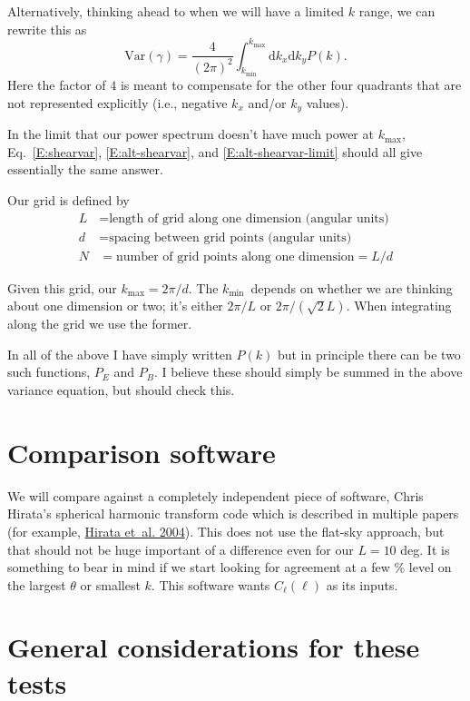 \documentclass[preprint]{aastex}
\newcommand{\kmax}{\ensuremath{k_\mathrm{max}}}
\newcommand{\kmin}{\ensuremath{k_\mathrm{min}}}
\newcommand{\rmd}{\ensuremath{\mathrm{d}}}
\newcommand{\beq}{\begin{equation}}
\newcommand{\eeq}{\end{equation}}
\begin{document}
Alternatively, thinking ahead to when we will have a limited $k$
range, we can rewrite this as
\beq\label{E:alt-shearvar-limit}
\mathrm{Var}(\gamma) = \frac{4}{(2\pi)^2} \int_{\kmin}^{\kmax} \rmd
k_x \rmd k_y P(k).
\eeq
Here the factor of $4$ is meant to compensate for the other four
quadrants that are not represented explicitly (i.e., negative $k_x$
and/or $k_y$ values).

In the limit that our power spectrum doesn't have much power at
\kmax, Eq.~\ref{E:shearvar}, \ref{E:alt-shearvar}, and
\ref{E:alt-shearvar-limit} should all give essentially the same answer.

Our
grid is defined by
\begin{align}
L &= \mbox{length of grid along one dimension (angular units)}\\
d &= \mbox{spacing between grid points (angular units)}\\
N &= \mbox{number of grid points along one dimension} = L/d
\end{align}

Given this grid, our $\kmax=2\pi/d$.  The \kmin\ depends on whether
we are thinking about one dimension or two; it's either $2\pi/L$ or
$2\pi/(\sqrt{2}L)$.  When integrating along the grid we use the former.

In all of the above I have simply written $P(k)$ but in principle there can be
two such functions, $P_{E}$ and $P_B$.  I believe these
should simply be summed in the above variance equation, but should check this.

\section{Comparison software}

We will compare against a completely independent piece of software,
Chris Hirata's spherical harmonic transform code which is described in
multiple papers (for example,
\href{http://adsabs.harvard.edu/abs/2004PhRvD..70j3501H}{Hirata
  et~al. 2004}).  This does not use the flat-sky
approach, but that should not be huge important of a difference even
for our $L=10$ deg.  It is something to bear in mind if we start
looking for agreement at a few \% level on the largest $\theta$ or
smallest $k$.  This software wants $C_\ell(\ell)$ as its inputs.

\section{General considerations for these tests}
\end{document}
